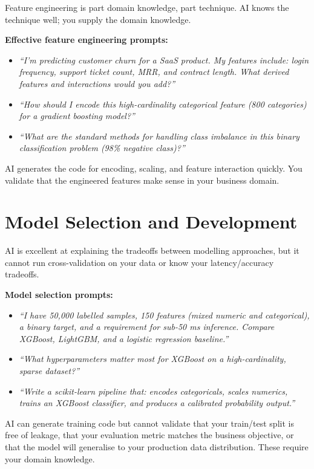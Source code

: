 Feature engineering is part domain knowledge, part technique.
AI knows the technique well; you supply the domain knowledge.

\textbf{Effective feature engineering prompts:}
\begin{itemize}
  \item \textit{``I'm predicting customer churn for a SaaS product. My features include: login frequency, support ticket count, MRR, and contract length. What derived features and interactions would you add?''}
  \item \textit{``How should I encode this high-cardinality categorical feature (800 categories) for a gradient boosting model?''}
  \item \textit{``What are the standard methods for handling class imbalance in this binary classification problem (98\% negative class)?''}
\end{itemize}

AI generates the code for encoding, scaling, and feature interaction quickly.
You validate that the engineered features make sense in your business domain.

\section{Model Selection and Development}
\label{sec:models}

AI is excellent at explaining the tradeoffs between modelling approaches,
but it cannot run cross-validation on your data or know your latency/accuracy tradeoffs.

\textbf{Model selection prompts:}
\begin{itemize}
  \item \textit{``I have 50,000 labelled samples, 150 features (mixed numeric and categorical), a binary target, and a requirement for sub-50 ms inference. Compare XGBoost, LightGBM, and a logistic regression baseline.''}
  \item \textit{``What hyperparameters matter most for XGBoost on a high-cardinality, sparse dataset?''}
  \item \textit{``Write a scikit-learn pipeline that: encodes categoricals, scales numerics, trains an XGBoost classifier, and produces a calibrated probability output.''}
\end{itemize}

\begin{warnbox}
AI can generate training code but cannot validate that your train/test split is free of
leakage, that your evaluation metric matches the business objective, or that the
model will generalise to your production data distribution.
These require your domain knowledge.
\end{warnbox}

